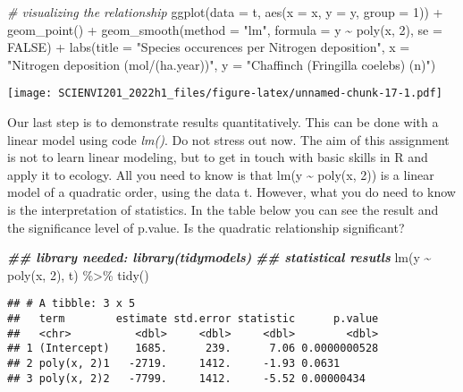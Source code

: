 \documentclass[
]{article}
\newenvironment{Shaded}{\begin{snugshade}}{\end{snugshade}}
\newcommand{\AttributeTok}[1]{\textcolor[rgb]{0.77,0.63,0.00}{#1}}
\newcommand{\CommentTok}[1]{\textcolor[rgb]{0.56,0.35,0.01}{\textit{#1}}}
\newcommand{\ConstantTok}[1]{\textcolor[rgb]{0.00,0.00,0.00}{#1}}
\newcommand{\DecValTok}[1]{\textcolor[rgb]{0.00,0.00,0.81}{#1}}
\newcommand{\DocumentationTok}[1]{\textcolor[rgb]{0.56,0.35,0.01}{\textbf{\textit{#1}}}}
\newcommand{\FunctionTok}[1]{\textcolor[rgb]{0.00,0.00,0.00}{#1}}
\newcommand{\NormalTok}[1]{#1}
\newcommand{\SpecialCharTok}[1]{\textcolor[rgb]{0.00,0.00,0.00}{#1}}
\newcommand{\StringTok}[1]{\textcolor[rgb]{0.31,0.60,0.02}{#1}}
\begin{document}
\begin{Shaded}
\begin{Highlighting}[]
\CommentTok{\# visualizing the relationship}
\FunctionTok{ggplot}\NormalTok{(}\AttributeTok{data =}\NormalTok{ t, }\FunctionTok{aes}\NormalTok{(}\AttributeTok{x =}\NormalTok{ x, }\AttributeTok{y =}\NormalTok{ y, }\AttributeTok{group =} \DecValTok{1}\NormalTok{)) }\SpecialCharTok{+}
  \FunctionTok{geom\_point}\NormalTok{() }\SpecialCharTok{+}
  \FunctionTok{geom\_smooth}\NormalTok{(}\AttributeTok{method =} \StringTok{"lm"}\NormalTok{, }\AttributeTok{formula =}\NormalTok{ y }\SpecialCharTok{\textasciitilde{}} \FunctionTok{poly}\NormalTok{(x, }\DecValTok{2}\NormalTok{), }\AttributeTok{se =} \ConstantTok{FALSE}\NormalTok{) }\SpecialCharTok{+}
  \FunctionTok{labs}\NormalTok{(}\AttributeTok{title =} \StringTok{"Species occurences per Nitrogen deposition"}\NormalTok{,}
       \AttributeTok{x =} \StringTok{"Nitrogen deposition (mol/(ha.year))"}\NormalTok{,}
       \AttributeTok{y =} \StringTok{"Chaffinch (Fringilla coelebs) (n)"}\NormalTok{)}
\end{Highlighting}
\end{Shaded}

\texttt{[image: SCIENVI201\_2022h1\_files/figure-latex/unnamed-chunk-17-1.pdf]}

Our last step is to demonstrate results quantitatively. This can be done
with a linear model using code \emph{lm()}. Do not stress out now. The
aim of this assignment is not to learn linear modeling, but to get in
touch with basic skills in R and apply it to ecology. All you need to
know is that lm(y \textasciitilde{} poly(x, 2)) is a linear model of a
quadratic order, using the data t. However, what you do need to know is
the interpretation of statistics. In the table below you can see the
result and the significance level of p.value. Is the quadratic
relationship significant?

\begin{Shaded}
\begin{Highlighting}[]
\DocumentationTok{\#\# library needed: library(tidymodels)}
\DocumentationTok{\#\# statistical resutls}
\FunctionTok{lm}\NormalTok{(y }\SpecialCharTok{\textasciitilde{}} \FunctionTok{poly}\NormalTok{(x, }\DecValTok{2}\NormalTok{), t) }\SpecialCharTok{\%\textgreater{}\%}
  \FunctionTok{tidy}\NormalTok{()}
\end{Highlighting}
\end{Shaded}

\begin{verbatim}
## # A tibble: 3 x 5
##   term        estimate std.error statistic      p.value
##   <chr>          <dbl>     <dbl>     <dbl>        <dbl>
## 1 (Intercept)    1685.      239.      7.06 0.0000000528
## 2 poly(x, 2)1   -2719.     1412.     -1.93 0.0631      
## 3 poly(x, 2)2   -7799.     1412.     -5.52 0.00000434
\end{verbatim}
\end{document}
